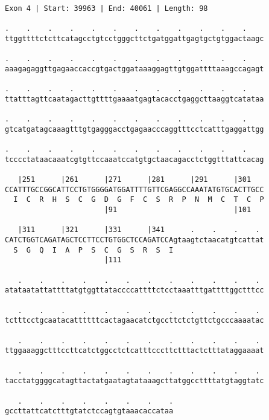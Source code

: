 \documentclass{article}
\begin{document}
\newpage
\begin{Verbatim}[fontfamily=courier]
Exon 4 | Start: 39963 | End: 40061 | Length: 98

.    .    .    .    .    .    .    .    .    .    .    .    
ttggttttctcttcatagcctgtcctgggcttctgatggattgagtgctgtggactaagc

.    .    .    .    .    .    .    .    .    .    .    .    
aaagagaggttgagaaccaccgtgactggataaaggagttgtggattttaaagccagagt

.    .    .    .    .    .    .    .    .    .    .    .    
ttatttagttcaatagacttgttttgaaaatgagtacacctgaggcttaaggtcatataa

.    .    .    .    .    .    .    .    .    .    .    .    
gtcatgatagcaaagtttgtgagggacctgagaacccaggtttcctcatttgaggattgg

.    .    .    .    .    .    .    .    .    .    .    .    
tcccctataacaaatcgtgttccaaatccatgtgctaacagacctctggtttattcacag

   |251      |261      |271      |281      |291      |301   
CCATTTGCCGGCATTCCTGTGGGGATGGATTTTGTTCGAGGCCAAATATGTGCACTTGCC
  I  C  R  H  S  C  G  D  G  F  C  S  R  P  N  M  C  T  C  P
                       |91                           |101   

   |311      |321      |331      |341      .    .    .    . 
CATCTGGTCAGATAGCTCCTTCCTGTGGCTCCAGATCCAgtaagtctaacatgtcattat
  S  G  Q  I  A  P  S  C  G  S  R  S  I                     
                       |111                                 

   .    .    .    .    .    .    .    .    .    .    .    . 
atataatattattttatgtggttataccccattttctcctaaatttgattttggctttcc

   .    .    .    .    .    .    .    .    .    .    .    . 
tctttcctgcaatacattttttcactagaacatctgccttctctgttctgcccaaaatac

   .    .    .    .    .    .    .    .    .    .    .    . 
ttggaaaggctttccttcatctggcctctcatttcccttctttactctttataggaaaat

   .    .    .    .    .    .    .    .    .    .    .    . 
tacctatggggcatagttactatgaatagtataaagcttatggccttttatgtaggtatc

   .    .    .    .    .    .    .    .
gccttattcatctttgtatctccagtgtaaacaccataa
\end{Verbatim}
\newpage
\end{document}
